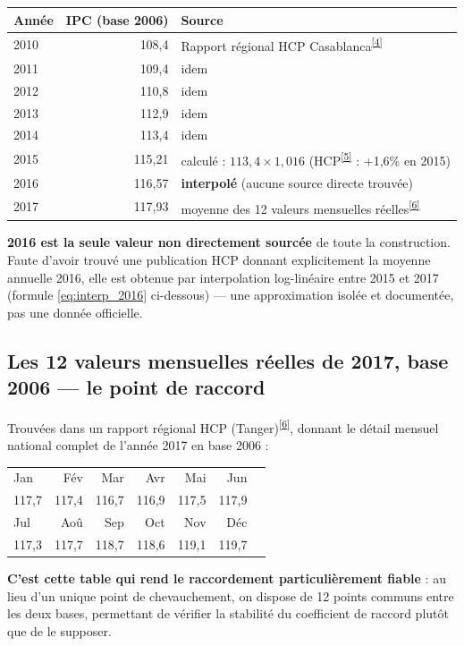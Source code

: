 \documentclass[11pt,a4paper]{article}
\newcommand{\cit}[1]{\textsuperscript{\hyperlink{ref#1}{[#1]}}}
\begin{document}
\begin{fichebox}
\begin{center}
\small
\begin{tabular}{lrl}
\toprule
\textbf{Année} & \textbf{IPC (base 2006)} & \textbf{Source} \\
\midrule
2010 & 108,4 & Rapport régional HCP Casablanca\cit{4} \\
2011 & 109,4 & idem \\
2012 & 110,8 & idem \\
2013 & 112,9 & idem \\
2014 & 113,4 & idem \\
2015 & 115,21 & calculé : $113{,}4 \times 1{,}016$ (HCP\cit{5} : +1,6\% en 2015) \\
2016 & 116,57 & \textbf{interpolé} (aucune source directe trouvée) \\
2017 & 117,93 & moyenne des 12 valeurs mensuelles réelles\cit{6} \\
\bottomrule
\end{tabular}
\end{center}
\end{fichebox}

\begin{alertebox}
\textbf{2016 est la seule valeur non directement sourcée} de toute la construction. Faute d'avoir trouvé une publication HCP donnant explicitement la moyenne annuelle 2016, elle est obtenue par interpolation log-linéaire entre 2015 et 2017 (formule \ref{eq:interp_2016} ci-dessous) --- une approximation isolée et documentée, pas une donnée officielle.
\end{alertebox}

\subsection{Les 12 valeurs mensuelles réelles de 2017, base 2006 --- le point de raccord}

\begin{fichebox}
Trouvées dans un rapport régional HCP (Tanger)\cit{6}, donnant le détail mensuel national complet de l'année 2017 en base 2006 :
\begin{center}
\small
\begin{tabular}{lrrrrrr}
\toprule
Jan & Fév & Mar & Avr & Mai & Jun \\
117,7 & 117,4 & 116,7 & 116,9 & 117,5 & 117,9 \\
\midrule
Jul & Aoû & Sep & Oct & Nov & Déc \\
117,3 & 117,7 & 118,7 & 118,6 & 119,1 & 119,7 \\
\bottomrule
\end{tabular}
\end{center}
\textbf{C'est cette table qui rend le raccordement particulièrement fiable} : au lieu d'un unique point de chevauchement, on dispose de 12 points communs entre les deux bases, permettant de vérifier la stabilité du coefficient de raccord plutôt que de le supposer.
\end{fichebox}
\end{document}
